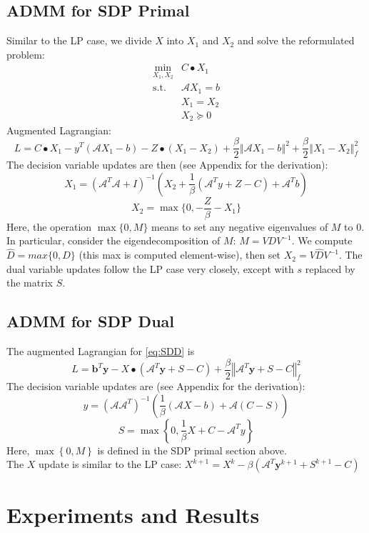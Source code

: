 \documentclass{article}
\begin{document}
\subsection*{ADMM for SDP Primal}
Similar to the LP case, we divide $X$ into $X_{1}$ and $X_{2}$
and solve the reformulated problem:
\begin{eqnarray*}
\min_{X_{1},X_{2}} & C\bullet X_{1}\\
\text{s.t.} & \mathcal{A}X_{1}=b\\
 & X_{1}=X_{2}\\
 & X_{2}\succeq0
\end{eqnarray*}
Augmented Lagrangian:
\[
L=C\bullet X_{1}-y^{T}\left(\mathcal{A}X_{1}-b\right)-Z\bullet\left(X_{1}-X_{2}\right)+\frac{\beta}{2}\left\Vert \mathcal{A}X_{1}-b\right\Vert ^{2}+\frac{\beta}{2}\left\Vert X_{1}-X_{2}\right\Vert _{f}^{2}
\]
The decision variable updates are then (see Appendix for the derivation):
\[
X_{1}=\left(\mathcal{A}^{T}\mathcal{A}+I\right)^{-1}\left(X_{2}+\frac{1}{\beta}\left(\mathcal{A}^{T}y+Z-C\right)+\mathcal{A}^{T}b\right)
\]
\[
X_{2} = \max\{0,-\frac{Z}{\beta}-X_{1}\}
\]
Here, the operation $\max\{0,M\}$ means to set any negative eigenvalues
of $M$ to 0. In particular, consider the eigendecomposition of $M$:
$M=VDV^{-1}$. We compute $\hat{D}=max\{0,D\}$ (this max is computed
element-wise), then set $X_{2}=V\hat{D}V^{-1}$. The dual variable updates follow the LP case very closely, except with $s$ replaced by the matrix $S$. 

\subsection*{ADMM for SDP Dual}
The augmented Lagrangian for \eqref{eq:SDD} is
\[
L=\mathbf{b}^{T}\mathbf{y}-X\bullet\left(\mathcal{A}^{T}\mathbf{y}+S-C\right)+\frac{\beta}{2}\left\Vert \mathcal{A}^{T}\mathbf{y}+S-C\right\Vert _{f}^{2}
\]
The decision variable updates are (see Appendix for the derivation):
\[
y=\left(\mathcal{A}\mathcal{A}^{T}\right)^{-1}\left(\frac{1}{\beta}\left(\mathcal{A}X-b\right)+\mathcal{A}\left(C-S\right)\right)
\]
\[
S=\max\left\{ 0,\frac{1}{\beta}X+C-\mathcal{A}^{T}y\right\} 
\]
Here, $\max\left\{ 0,M\right\} $ is defined in the SDP primal section above. \\
The $X$ update is similar to the LP case: $X^{k+1}=X^{k}-\beta\left(\mathcal{A}^{T}\mathbf{y}^{k+1}+S^{k+1}-C\right)$

\section{Experiments and Results}
\end{document}
